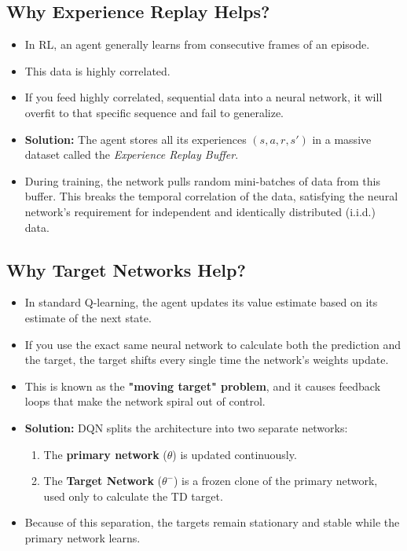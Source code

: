 \documentclass[12pt]{article}
\begin{document}
\subsection*{Why Experience Replay Helps?}
\begin{itemize}[label=$\bullet$]
    \item In RL, an agent generally learns from consecutive frames of an episode.
    \item This data is highly correlated.
    \item If you feed highly correlated, sequential data into a neural network, it will overfit to that specific sequence and fail to generalize.
    \item \textbf{Solution:} The agent stores all its experiences $(s, a, r, s')$ in a massive dataset called the \textit{Experience Replay Buffer}. 
    \item During training, the network pulls random mini-batches of data from this buffer. This breaks the temporal correlation of the data, satisfying the neural network's requirement for independent and identically distributed (i.i.d.) data.
\end{itemize}

\subsection*{Why Target Networks Help?}
\begin{itemize}[label=$\bullet$]
    \item In standard Q-learning, the agent updates its value estimate based on its estimate of the next state.
    \item If you use the exact same neural network to calculate both the prediction and the target, the target shifts every single time the network's weights update.
    \item This is known as the \textbf{"moving target" problem}, and it causes feedback loops that make the network spiral out of control.
    \item \textbf{Solution:} DQN splits the architecture into two separate networks:
    \begin{enumerate}
        \item The \textbf{primary network} ($\theta$) is updated continuously.
        \item The \textbf{Target Network} ($\theta^-$) is a frozen clone of the primary network, used only to calculate the TD target.
    \end{enumerate}
    \item Because of this separation, the targets remain stationary and stable while the primary network learns.
\end{itemize}
\end{document}
